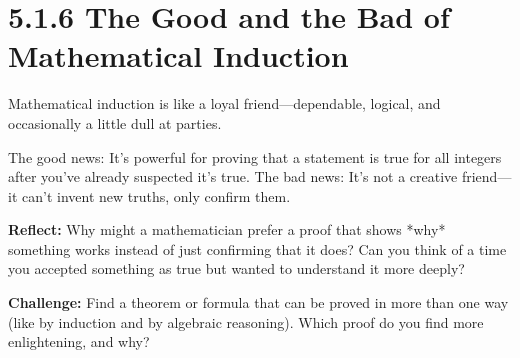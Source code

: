 \section*{5.1.6 The Good and the Bad of Mathematical Induction}

Mathematical induction is like a loyal friend—dependable, logical, and occasionally a little dull at parties.  

The good news: It’s powerful for proving that a statement is true for all integers after you’ve already suspected it’s true.  
The bad news: It’s not a creative friend—it can’t invent new truths, only confirm them.

\textbf{Reflect:}  
Why might a mathematician prefer a proof that shows *why* something works instead of just confirming that it does?  
Can you think of a time you accepted something as true but wanted to understand it more deeply?

\textbf{Challenge:}  
Find a theorem or formula that can be proved in more than one way (like by induction and by algebraic reasoning). Which proof do you find more enlightening, and why?

